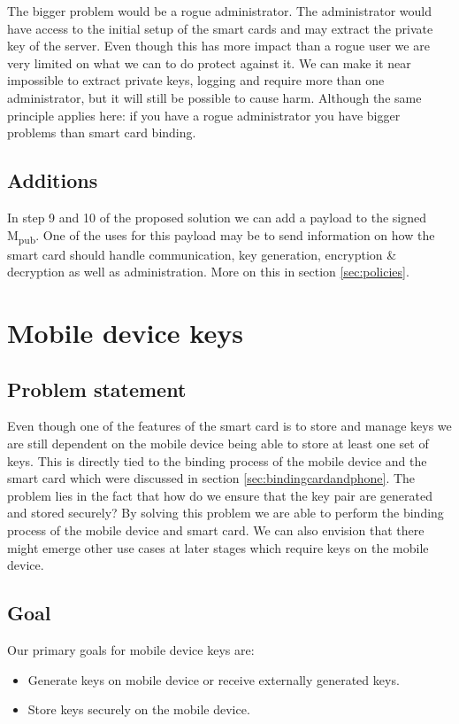 The bigger problem would be a rogue administrator. The administrator would have access to the initial setup of the smart cards and may extract the private key of the server. Even though this has more impact than a rogue user we are very limited on what we can to do protect against it. We can make it near impossible to extract private keys, logging and require more than one administrator, but it will still be possible to cause harm. Although the same principle applies here: if you have a rogue administrator you have bigger problems than smart card binding.


\subsection{Additions}
In step 9 and 10 of the proposed solution we can add a payload to the signed M\textsubscript{pub}. One of the uses for this payload may be to send information on how the smart card should handle communication, key generation, encryption \& decryption as well as administration. More on this in section \ref{sec:policies}.


\section{Mobile device keys}
\label{sec:mobileDeviceKeys}


\subsection{Problem statement}
Even though one of the features of the smart card is to store and manage keys we are still dependent on the mobile device being able to store at least one set of keys. This is directly tied to the binding process of the mobile device and the smart card which were discussed in section \ref{sec:bindingcardandphone}. The problem lies in the fact that how do we ensure that the key pair are generated and stored securely? By solving this problem we are able to perform the binding process of the mobile device and smart card. We can also envision that there might emerge other use cases at later stages which require keys on the mobile device.

\subsection{Goal}
Our primary goals for mobile device keys are:

\begin{itemize}
  \item Generate keys on mobile device or receive externally generated keys.
  \item Store keys securely on the mobile device.
\end{itemize}

